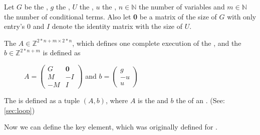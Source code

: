 \begin{definition}
	\label{def:iteration}
	Let $G$ be the \guardmatrix, $g$ the \guardconstants, $U$ the \updatematrix, $u$ the \updateconstants, $n\in \mathbb{N}$ the number of variables and $m \in \mathbb{N}$ the number of conditional terms. \newline
	Also let \textbf{0} be a matrix of the size of $G$ with only entry's 0 and $I$ denote the identity matrix with the size of $U$. \newline
	
	The \iterationmatrix $A \in \mathbb{Z}^{2*n+m \times 2*n}$, which defines one complete execution of the \loopt, and the \iterationconstants $b\in \mathbb{Z}^{2*n+m} $ is defined as
	\begin{figure}[H]
		\centering
		$A = \begin{pmatrix} G & \textbf{0} \\ M & -I \\ -M & I \end{pmatrix}$ and $b = \begin{pmatrix} g \\ -u \\ u \end{pmatrix}$ \cite{leike2014geometric}
	\end{figure}	
\end{definition}

\begin{definition}[LOOP]
	The \loopt is defined as a tuple $(A, b)$, where $A$ is the \iterationmatrix and $b$ the \iterationconstants of an \its. (See: \autoref{sec:loop})
\end{definition}

Now we can define the key element, which was originally defined for . 

